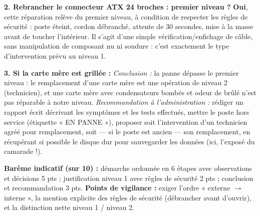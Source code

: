 \documentclass[11pt]{article}
\begin{document}
\begin{corrige}
\textbf{2. Rebrancher le connecteur ATX 24 broches : premier niveau ?}
\textbf{Oui}, cette réparation relève du premier niveau, à condition de respecter les règles de sécurité : poste éteint, cordon débranché, attente de 30 secondes, mise à la masse avant de toucher l'intérieur. Il s'agit d'une simple vérification/enfichage de câble, sans manipulation de composant nu ni soudure : c'est exactement le type d'intervention prévu au niveau 1.

\textbf{3. Si la carte mère est grillée :}
\emph{Conclusion :} la panne dépasse le premier niveau : le remplacement d'une carte mère est une opération de niveau 2 (technicien), et une carte mère avec condensateurs bombés et odeur de brûlé n'est pas réparable à notre niveau.
\emph{Recommandation à l'administration :} rédiger un rapport écrit décrivant les symptômes et les tests effectués, mettre le poste hors service (étiquette « EN PANNE »), proposer soit l'intervention d'un technicien agréé pour remplacement, soit — si le poste est ancien — son remplacement, en récupérant si possible le disque dur pour sauvegarder les données (ici, l'exposé du camarade !).

\textbf{Barème indicatif (sur 10) :} démarche ordonnée en 6 étapes avec observations et décisions 5 pts ; justification niveau 1 avec règles de sécurité 2 pts ; conclusion et recommandation 3 pts.
\textbf{Points de vigilance :} exiger l'ordre « externe $\to$ interne », la mention explicite des règles de sécurité (débrancher avant d'ouvrir), et la distinction nette niveau 1 / niveau 2.
\end{corrige}
\end{document}

